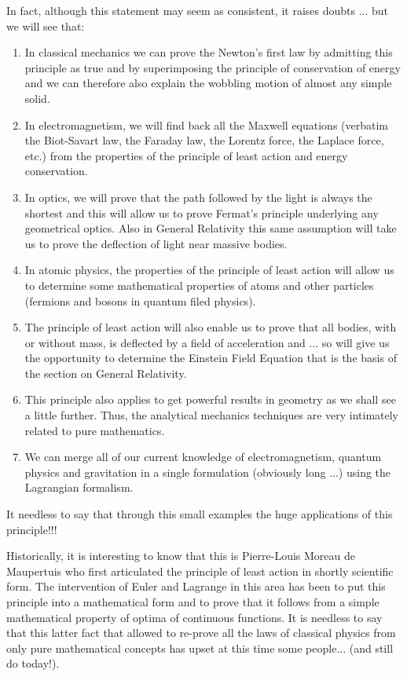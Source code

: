 	In fact, although this statement may seem as consistent, it raises doubts ... but we will see that:
	\begin{enumerate}
		\item In classical mechanics we can prove the Newton's first law by admitting this principle as true and by superimposing the principle of conservation of energy and we can therefore also explain the wobbling motion of almost any simple solid.
		
		\item In electromagnetism, we will find back all the Maxwell equations (verbatim the Biot-Savart law, the Faraday law, the Lorentz force, the Laplace force, etc.) from the properties of the principle of least action and energy conservation.
		
		\item In optics, we will prove that the path followed by the light is always the shortest and this will allow us to prove Fermat's principle underlying any geometrical optics. Also in General Relativity this same assumption will take us to prove the deflection of light near massive bodies.
		
		\item In atomic physics, the properties of the principle of least action will allow us to determine some mathematical properties of atoms and other particles (fermions and bosons in quantum filed physics).
		
		\item The principle of least action will also enable us to prove that all bodies, with or without mass, is deflected by a field of acceleration and ... so will give us the opportunity to determine the Einstein Field Equation  that is the basis of the section on General Relativity.
		
		\item This principle also applies to get powerful results in geometry as we shall see a little further. Thus, the analytical mechanics techniques are very intimately related to pure mathematics.
		
		\item We can merge all of our current knowledge of electromagnetism, quantum physics and gravitation in a single formulation (obviously long ...) using the Lagrangian formalism.
	\end{enumerate}
	
	It needless to say that through this small examples the huge applications of this principle!!!

	Historically, it is interesting to know that this is Pierre-Louis Moreau de Maupertuis who first articulated the principle of least action in shortly scientific form. The intervention of Euler and Lagrange in this area has been to put this principle into a mathematical form and to prove that it follows from a simple mathematical property of optima of continuous functions. It is needless to say that this latter fact that allowed to re-prove all the laws of classical physics from only pure mathematical concepts has upset at this time some people... (and still do today!).
	
